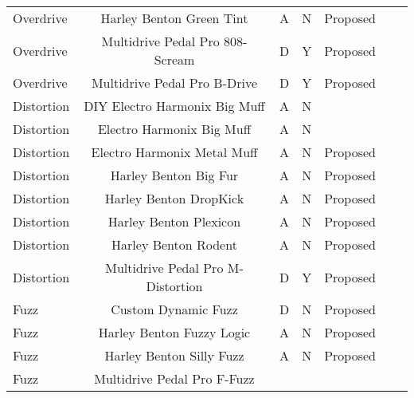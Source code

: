 \begin{table*}[]
{\begin{tabular}{lcccccc}
            Overdrive 
                & Harley Benton Green Tint 
                & A 
                & N 
                & Proposed \\
            Overdrive 
                & Multidrive Pedal Pro 808-Scream 
                & D 
                & Y 
                & Proposed \\
            Overdrive 
                & Multidrive Pedal Pro B-Drive 
                & D 
                & Y 
                & Proposed \\
            \midrule
            Distortion 
                & DIY Electro Harmonix Big Muff 
                & A 
                & N 
                & \cite{guitarml} \\
            Distortion 
                & Electro Harmonix Big Muff 
                & A 
                & N 
                & \cite{wright2019real} \\
            Distortion 
                & Electro Harmonix Metal Muff 
                & A 
                & N 
                & Proposed \\
            Distortion 
                & Harley Benton Big Fur 
                & A 
                & N 
                & Proposed \\
            Distortion 
                & Harley Benton DropKick 
                & A 
                & N 
                & Proposed \\
            Distortion 
                & Harley Benton Plexicon 
                & A 
                & N 
                & Proposed \\
            Distortion 
                & Harley Benton Rodent 
                & A 
                & N 
                & Proposed \\
            Distortion 
                & Multidrive Pedal Pro M-Distortion 
                & D 
                & Y 
                & Proposed \\
            \midrule
            Fuzz 
                & Custom Dynamic Fuzz 
                & D 
                & N 
                & Proposed \\
            Fuzz 
                & Harley Benton Fuzzy Logic 
                & A 
                & N 
                & Proposed \\
            Fuzz 
                & Harley Benton Silly Fuzz 
                & A 
                & N 
                & Proposed \\
            Fuzz 
                & Multidrive Pedal Pro F-Fuzz 

\end{tabular}}
\end{table*}
